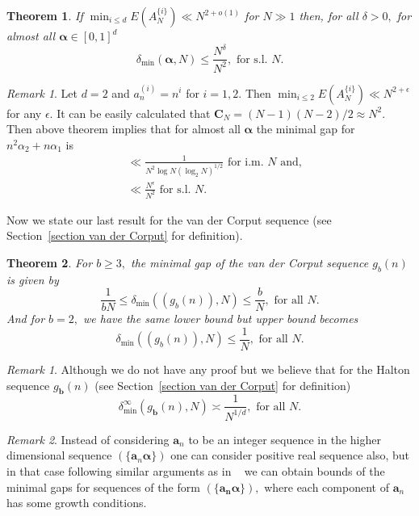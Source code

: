\documentclass[12pt,article]{amsart}
\newtheorem{theorem}{Theorem}[section]
\theoremstyle{remark}
\newtheorem{remark}{Remark}
\newtheorem*{remark*}{Remark}
\numberwithin{equation}{section}
\newcommand{\boldb}{\boldsymbol{b}}
\newcommand{\bolda}{\boldsymbol{a}}
\newcommand{\boldCN}{\boldsymbol{C}_N}
\newcommand{\boldalpha}{\boldsymbol{\alpha}}
\begin{document}
	\begin{theorem}\label{thm3.1}
		If $\min_{i\leq d}E(A_N^{\{i\}})\ll N^{2+o(1)}$ for $N\gg 1$ then, for all $\delta>0,$ for almost all $\boldalpha\in[0,1]^d$
		\[\delta_{\text{min}}(\boldalpha,N)\leq\frac{N^\delta}{N^2}, \text{ for s.l. }N.\]
	\end{theorem}
	
	\begin{remark*}
		Let $d=2$ and $a_n^{(i)}=n^i$ for $i=1,2.$ Then $\min_{i\leq 2}E(A_N^{\{i\}})\ll N^{2+\epsilon}$ for any $\epsilon.$ It can be easily calculated that $\boldCN=(N-1)(N-2)/2\approx N^2.$ Then above theorem implies that for almost all $\boldalpha$ the minimal gap for $n^2\alpha_2+n\alpha_1$ is 
		\begin{align*}
			&\ll \frac{1}{N^2\log N(\log_2 N)^{1/2}}\text{  for i.m. }N \text{ and,}\\ %
			&\ll \frac{N^\epsilon}{N^2}\text{  for s.l. }N. %
		\end{align*} 
	\end{remark*}
	
	Now we state our last result for the van der Corput sequence (see Section~\ref{section van der Corput} for definition).
	\begin{theorem}\label{thm4}
		For $b\geq 3,$ the minimal gap of the van der Corput sequence $g_b(n)$ is given by
		\[\frac{1}{bN}\leq\delta_{\text{min}}((g_b(n)),N)\leq \frac{b}{N},\text{ for all } N.\]
		And for $b=2,$ we have the same lower bound but upper bound becomes 
		\[\delta_{\text{min}}((g_b(n)),N)\leq \frac{1}{N},\text{ for all } N.\]
	\end{theorem}
	
	\begin{remark}
		Although we do not have any proof but we believe that for the Halton sequence $g_{\boldb}(n)$ (see Section~\ref{section van der Corput} for definition)
		\[\delta_{\text{min}}^\infty(g_{\boldb}(n),N)\asymp \frac{1}{N^{1/d}}, \text{ for all } N.\]
	\end{remark}
	
	\begin{remark}
		Instead of considering $\bolda_n$ to be an integer sequence in the higher dimensional sequence $(\{\bolda_n\boldalpha\})$ one can consider positive real sequence also, but in that case following similar arguments as in ~\cite{shvoreghvim2021} we can obtain bounds of the minimal gaps for sequences of the form  $(\{\boldsymbol{a_n}\boldalpha\}),$ where each component of $\bolda_n$ has some growth conditions.
	\end{remark}
	
\end{document}
